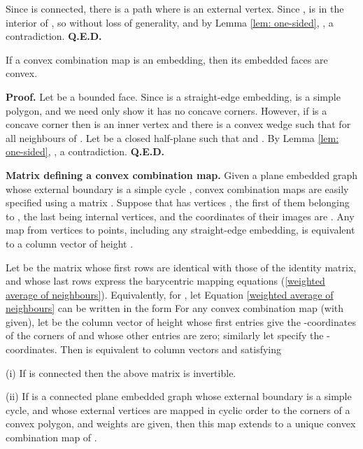 Since  is connected, there is a path
 where  is an external
vertex.  Since ,  is in the interior 
of ,
so without loss of generality,  and
by Lemma \ref{lem: one-sided}, , a contradiction.
{\bf Q.E.D.}\medskip

\begin{lemma}
\label{lem: conv comb emb conv faces}
If a convex combination map is an embedding, then its
embedded faces are convex.
\end{lemma}

{\bf Proof.} Let  be a bounded face.
Since  is a straight-edge embedding, 
is a simple polygon, and we need only show it has
no concave corners.  However, if  is a concave
corner then  is an inner vertex and
there is a convex wedge  such that 
for all neighbours  of . Let  be a closed
half-plane such that  and . By Lemma \ref{lem: one-sided}, , a contradiction.
{\bf Q.E.D.}\medskip


\numpara
\label{matrix defining a convex combination map} {\bf Matrix defining a convex combination map.} Given
a plane embedded graph  whose external boundary
is a simple cycle , convex combination maps are easily specified
using a matrix .  Suppose that  has
 vertices , the first  of them
belonging to , the last  being
internal vertices, and the coordinates of their
images are .  Any map from
vertices to points, including any straight-edge
embedding, is equivalent to a column vector of height .

Let  be the  matrix whose first
 rows are identical with those of the identity
matrix, and whose
last  rows express the barycentric mapping
equations (\ref{weighted average of neighbours}). Equivalently,
for , let
 Equation
\ref{weighted average of neighbours} can be written in
the form
 For
any convex combination map  (with
 given), let  be the column vector of
height 
whose first  entries give the -coordinates
of the corners of 
and whose other entries are zero; similarly
let  specify the -coordinates. Then  is
equivalent to column vectors  and  satisfying



\begin{lemma}
\label{unique convex combination map} {\rm (i)} If  is connected then the above matrix  is
invertible.

{\rm (ii)} If  is a connected plane embedded graph whose external
boundary is a simple cycle, and whose external
vertices are mapped in cyclic order to the corners of
a convex polygon, and weights  are given,
then this map extends to a unique
convex combination map of .
\end{lemma}

